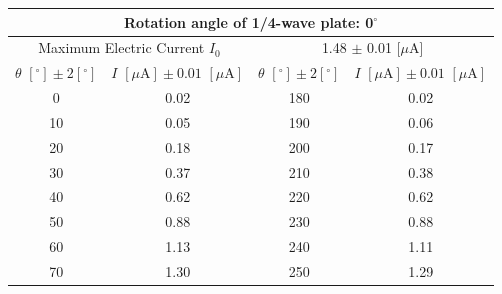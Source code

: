 \documentclass[a4paper]{article}
\begin{document}
\begin{table}[H]
	\centering
	\begin{tabular}{cc||cc}
		\multicolumn{4}{c}{Rotation angle of 1/4-wave plate: 0$^\circ$}                                                                                                                           \\
		\hline
		\multicolumn{2}{c}{Maximum Electric Current $I_0$} & \multicolumn{2}{c}{1.48 $\pm$ 0.01 [$\mu$A]}                                                                                         \\
		\hline
		$\theta\,\,[^\circ] \pm 2[^\circ]$                 & $I\,\,[\mu\text{A}] \pm 0.01\,\,[\mu\text{A}]$ & $\theta\,\,[^\circ] \pm 2[^\circ]$ & $I\,\,[\mu\text{A}] \pm 0.01\,\,[\mu\text{A}]$ \\
		\hline
		0                                                  & 0.02                                           & 180                                & 0.02                                           \\
		10                                                 & 0.05                                           & 190                                & 0.06                                           \\
		20                                                 & 0.18                                           & 200                                & 0.17                                           \\
		30                                                 & 0.37                                           & 210                                & 0.38                                           \\
		40                                                 & 0.62                                           & 220                                & 0.62                                           \\
		50                                                 & 0.88                                           & 230                                & 0.88                                           \\
		60                                                 & 1.13                                           & 240                                & 1.11                                           \\
		70                                                 & 1.30                                           & 250                                & 1.29                                           \\

\end{tabular}
\end{table}
\end{document}
